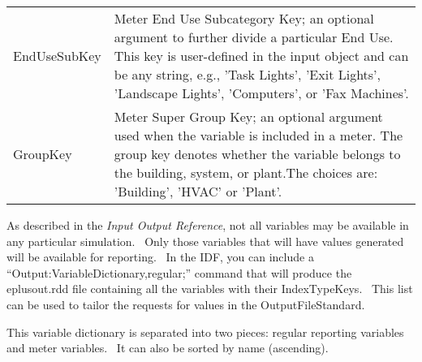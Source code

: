 \begin{longtable}[c]{p{1.5in}p{4.5in}}
EndUseSubKey & Meter End Use Subcategory Key; an optional argument to further divide a particular End Use.~ This key is user-defined in the input object and can be any string, e.g., 'Task Lights', 'Exit Lights', 'Landscape Lights', 'Computers', or 'Fax Machines'. \tabularnewline
GroupKey & Meter Super Group Key; an optional argument used when the variable is included in a meter. The group key denotes whether the variable belongs to the building, system, or plant.The choices are: 'Building', 'HVAC' or 'Plant'. \tabularnewline
\bottomrule
\end{longtable}

As described in the \emph{Input Output Reference}, not all variables may be available in any particular simulation.~ Only those variables that will have values generated will be available for reporting.~ In the IDF, you can include a ``Output:VariableDictionary,regular;'' command that will produce the eplusout.rdd file containing all the variables with their IndexTypeKeys.~ This list can be used to tailor the requests for values in the OutputFileStandard.

This variable dictionary is separated into two pieces: regular reporting variables and meter variables.~ It can also be sorted by name (ascending).


